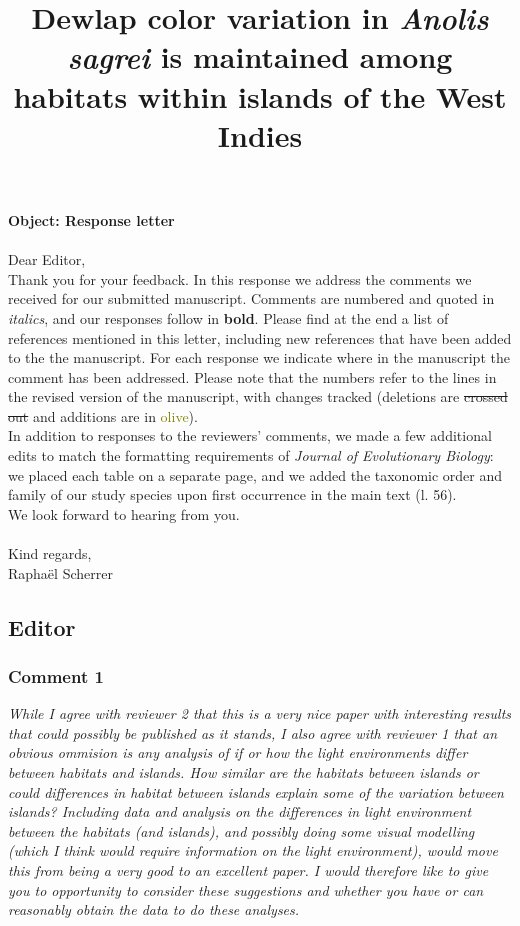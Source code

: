 \documentclass{article}
\title{Dewlap color variation in \textit{Anolis sagrei} is maintained among habitats within islands of the West Indies}
\date{}
\begin{document}
	
	\maketitle
	
	\textbf{Object: Response letter}\\\\
	
	Dear Editor,\\
	
	Thank you for your feedback. In this response we address the comments we received for our submitted manuscript. Comments are numbered and quoted in \textit{italics}, and our responses follow in \textbf{bold}. Please find at the end a list of references mentioned in this letter, including new references that have been added to the the manuscript. For each response we indicate where in the manuscript the comment has been addressed. Please note that the numbers refer to the lines in the revised version of the manuscript, with changes tracked (deletions are \sout{crossed out} and additions are in \textcolor{olive}{olive}).\\
	
	In addition to responses to the reviewers' comments, we made a few additional edits to match the formatting requirements of \textit{Journal of Evolutionary Biology}: we placed each table on a separate page, and we added the taxonomic order and family of our study species upon first occurrence in the main text (l. 56).\\
	
	We look forward to hearing from you.\\\\
	
	Kind regards,\\
	
	Rapha\"{e}l Scherrer
	
	\pagebreak
	
	\subsection*{Editor}
	
	\subsubsection*{Comment 1}
	
	\textit{While I agree with reviewer 2 that this is a very nice paper with interesting results that could possibly be published as it stands, I also agree with reviewer 1 that an obvious ommision is any analysis of if or how the light environments differ between habitats and islands. How similar are the habitats between islands or could differences in habitat between islands explain some of the variation between islands? Including data and analysis on the differences in light environment between the habitats (and islands), and possibly doing some visual modelling (which I think would require information on the light environment), would move this from being a very good to an excellent paper. I would therefore like to give you to opportunity to consider these suggestions and whether you have or can reasonably obtain the data to do these analyses.}\\
	
\end{document}
